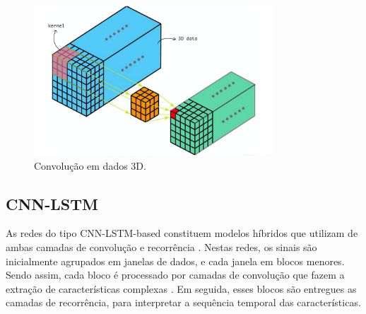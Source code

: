 \begin{figure}[h!]
  \centering
  \caption{Convolução em dados 3D.}
   \label{fig:cnn_convolution_3d}
   \includegraphics[width=0.8\textwidth]{figuras/cnn_3d.png}
\end{figure}

\subsection{CNN-LSTM}

As redes do tipo CNN-LSTM-based constituem modelos híbridos que utilizam de ambas camadas de convolução e recorrência \cite{Deep2019}. Nestas redes, os sinais são inicialmente agrupados em janelas de dados, e cada janela em blocos menores. Sendo assim, cada bloco é processado por camadas de convolução que fazem a extração de características complexas \cite{Deep2019}. Em seguida, esses blocos são entregues as camadas de recorrência, para interpretar a sequência temporal das características.